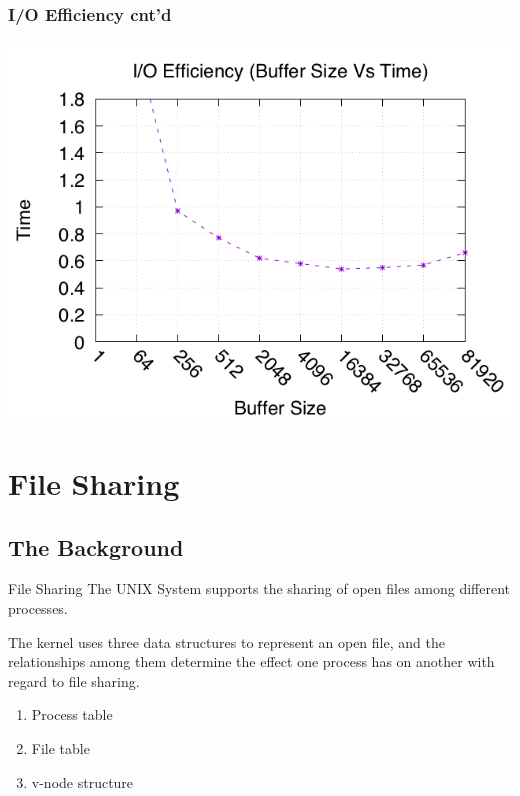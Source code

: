 \documentclass[newPxFont,sthlmFooter,nooffset]{beamer}
\begin{document}
\begin{frame}[t]
  \frametitle{I/O Efficiency cnt'd}
\centering
\includegraphics[width=0.85\linewidth]{./figure/iotest2.png}
\end{frame}


\section{File Sharing} 
\subsection{The Background}

\begin{frame}[t]{File Sharing}
The UNIX System supports the sharing of open files among different processes. 

\bigskip
The kernel uses three data structures to represent an open file, and the relationships among them determine the effect one process has on another with regard to file sharing.

\bigskip
\begin{enumerate}
\item Process table
\item File table
\item v-node structure
\end{enumerate}

\end{frame}
\end{document}
